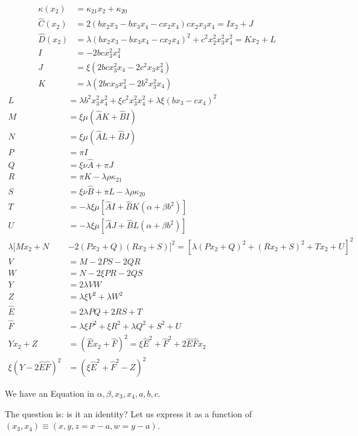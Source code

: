 \begin{align}
\kappa(x_2) &= \kappa_{21} x_2 + \kappa_{20}\\
\hat C(x_2) &= 2(bx_2x_3 - b x_3x_4 - cx_2 x_4 )cx_2 x_3 x_4 = Ix_2 + J \\
\hat D(x_2) &= \lambda (bx_2x_3 - b x_3x_4 - cx_2 x_4 )^2 + c^2x_2^2 x_3^2 x_4^2 = K x_2 + L \\
I &= - 2b cx_3^2x_4^2\\
J &= \xi (2bcx_3^2 x_4 - 2c^2 x_3 x_4^2)\\
K &= \lambda (2bc x_3 x_4^2 - 2b^2x_3^2 x_4 )\end{align}
\begin{align}
L &= \lambda b^2 x_3^2 x_4^2 + \xi c^2x_3^2 x_4^2+\lambda \xi (bx_3 - c x_4)^2\\
M &= \xi \mu(\hat AK  + \hat BI ) \\
N &= \xi \mu(\hat AL + \hat BJ) \\
P &= \pi I \\
Q &= \xi \nu \hat A + \pi J \\
R &= \pi K - \lambda \rho \kappa_{21}  \\
S &=\xi \nu \hat B + \pi L - \lambda \rho \kappa_{20} \\ 
T &= - \lambda \xi \mu [\hat AI  + \hat BK  (\alpha + \beta b^2)]\\
U &= - \lambda\xi \mu [\hat A J + \hat B L(\alpha + \beta b^2)]\\
\lambda [Mx_2 + N &-2 (Px_2 + Q)(Rx_2 + S) ]^2  = [\lambda\left(Px_2 + Q\right)^2 + \left(Rx_2 + S\right) ^2 + T x_2 + U]^2 \\
V &= M-2PS -2 QR\\
W &= N -2\xi PR-2 QS \\
Y &= 2\lambda VW\\
Z &= \lambda\xi V^2 + \lambda W^2 \\
\hat E &= 2\lambda PQ + 2RS + T\\
\hat F &= \lambda\xi P^2 +\xi R^2 + \lambda Q^2 + S^2 + U \\
Yx_2 + Z &= (\hat E x_2 + \hat F)^2 =  \xi \hat E^2 + \hat F^2 + 2\hat E\hat F x_2 \\
\xi (Y - 2\hat E\hat F)^2 &= \left(\xi \hat E^2 + \hat F^2 - Z\right)^2 
\end{align}

We have an Equation in $\alpha, \beta, x_3, x_4, a, b, c$.

The question is: is it an identity? Let us express it as a function of $(x_3,x_4) \equiv (x,y,z=x-a,w=y-a)$.

